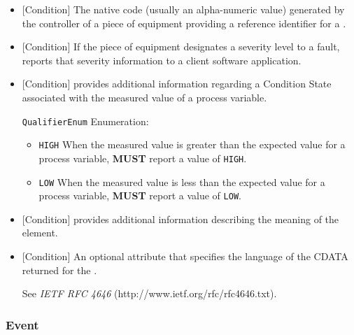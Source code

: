 \begin{itemize}

\item {}[Condition] \newline The native code (usually an alpha-numeric value) generated by the controller of a piece of equipment providing a reference identifier for a .

\item {}[Condition] \newline If the piece of equipment designates a severity level to a fault,  reports that severity information to a client software application.

\item {}[Condition] \newline {} provides additional information regarding a \gls{Condition State} associated with the measured value of a process variable.

\texttt{QualifierEnum} Enumeration:

\begin{itemize}
\item \texttt{HIGH} \newline When the measured value is greater than the expected value for a process variable,  \textbf{MUST} report a value of \texttt{HIGH}. 
\item \texttt{LOW} \newline When the measured value is less than the expected value for a process variable,  \textbf{MUST} report a value of \texttt{LOW}. 
\end{itemize}


\item {}[Condition] \newline {} provides additional information describing the meaning of the  element.

\item {}[Condition] \newline An optional attribute that specifies the language of the CDATA returned for the . 

See \textit{IETF RFC 4646} (http://www.ietf.org/rfc/rfc4646.txt).
\end{itemize}



\subsubsection{Event}
\label{sec:Event}



